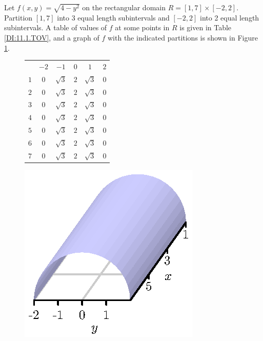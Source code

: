 \begin{activity} \label{A:11.1.3} Let $f(x,y) = \sqrt{4-y^2}$ on the rectangular domain $R = [1,7] \times [-2,2]$. Partition $[1,7]$ into 3 equal length subintervals and $[-2,2]$ into 2 equal length subintervals. A table of values of $f$ at some points in $R$ is given in Table \ref{DI:11.1.TOV}, and a graph of $f$ with the indicated partitions is shown in Figure \ref{F:11.1.DI_example}.

\begin{figure}[ht]
\begin{center}
\begin{minipage}{2.5in}
\begin{center}
\begin{tabular}{|c||c|c|c|c|c|} \hline
    &$-2$   &$-1$       &$0$    &$1$        &$2$ \\ \hhline{|=|=|=|=|=|=|}
$1$ &$0$    &$\sqrt{3}$ &$2$    &$\sqrt{3}$ &$0$ \\ \hline
$2$ &$0$    &$\sqrt{3}$ &$2$    &$\sqrt{3}$ &$0$ \\ \hline
$3$ &$0$    &$\sqrt{3}$ &$2$    &$\sqrt{3}$ &$0$ \\ \hline
$4$ &$0$    &$\sqrt{3}$ &$2$    &$\sqrt{3}$ &$0$ \\ \hline
$5$ &$0$    &$\sqrt{3}$ &$2$    &$\sqrt{3}$ &$0$ \\ \hline
$6$ &$0$    &$\sqrt{3}$ &$2$    &$\sqrt{3}$ &$0$ \\ \hline
$7$ &$0$    &$\sqrt{3}$ &$2$    &$\sqrt{3}$ &$0$ \\ \hline
\end{tabular}
\end{center}
\label{DI:11.1.TOV}
\end{minipage} \hspace{0.5in}
\begin{minipage}{2.5in}
\begin{center}
  \includegraphics{figures/fig_11_1_cylinder.eps}
\end{center}
\label{F:11.1.DI_example}
\end{minipage}
\end{center}
\end{figure}


\end{activity}
